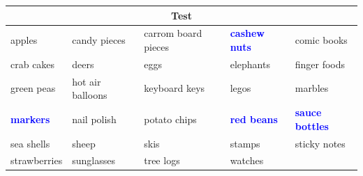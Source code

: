 \begin{tabular}{lllll}
\midrule
\multicolumn{5}{c}{Test} \\
\midrule
apples&candy pieces&carrom board pieces&\textbf{\textcolor{blue}{cashew nuts}}&comic books\\
crab cakes&deers&eggs&elephants&finger foods\\
green peas&hot air balloons&keyboard keys&legos&marbles\\
\textbf{\textcolor{blue}{markers}}&nail polish&potato chips&\textbf{\textcolor{blue}{red beans}}&\textbf{\textcolor{blue}{sauce bottles}}\\
sea shells&sheep&skis&stamps&sticky notes\\
strawberries&sunglasses&tree logs&watches\\

\bottomrule
\end{tabular}